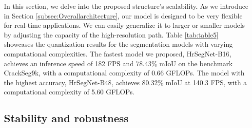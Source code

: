 \documentclass[preprint,12pt,authoryear]{elsarticle}
\begin{document}
In this section, we delve into the proposed structure's scalability. As we introduce in Section \ref{subsec:Overallarchitecture}, our model is designed to be very flexible for real-time applications. We can easily generalize it to larger or smaller models by adjusting the capacity of the high-resolution path. Table \ref{tab:table5} showcases the quantization results for the segmentation models with varying computational complexities. The fastest model we proposed, HrSegNet-B16, achieves an inference speed of 182 FPS and 78.43\% mIoU on the benchmark CrackSeg9k, with a computational complexity of 0.66 GFLOPs. The model with the highest accuracy, HrSegNet-B48, achieves 80.32\% mIoU at 140.3 FPS, with a computational complexity of 5.60 GFLOPs.


\subsection{Stability and robustness}
\end{document}
